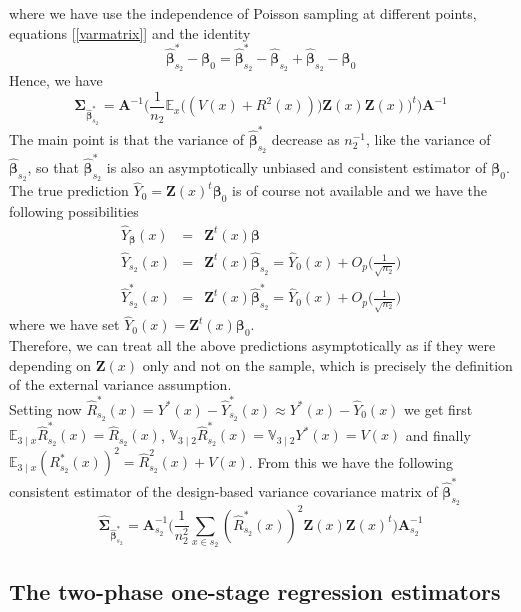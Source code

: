 \documentclass[a4paper,12pt,leqno, titlepage]{article}
\newcommand{\EX}{\mathbb{E}}
\newcommand{\VAR}{\mathbb{V}}
\begin{document}
where we have use the independence of Poisson sampling at different points, equations [\ref{varmatrix}] and the identity
$$\hat{\pmb{\beta}}^*_{s_2}-\pmb{\beta}_0=\hat{\pmb{\beta}}^*_{s_2}-\hat{\pmb{\beta}}_{s_2}
+\hat{\pmb{\beta}}_{s_2}- \pmb{\beta}_0$$
Hence, we have
\begin{equation}\label{twostagedbcovmatrix}
\pmb{\Sigma}_{\hat{\pmb{\beta}}^*_{s_2}}=
\pmb{A}^{-1}\Big(\frac{1}{n_2}\EX_x\big((V(x)+R^2(x))\big)\pmb{Z}(x)\pmb{Z}(x)\big)^t\Big)\pmb{A}^{-1}
\end{equation}
The main point is that the variance of $\hat{\pmb{\beta}}^*_{s_2}$ decrease as $n_2^{-1}$, like the variance of $\hat{\pmb{\beta}}_{s_2}$, so that $\hat{\pmb{\beta}}^*_{s_2}$  is also an asymptotically unbiased and consistent estimator of $\pmb{\beta}_0$. The true prediction $\hat{Y}_0=\pmb{Z}(x)^t\pmb{\beta}_0$ is of course not available and we have the following possibilities
\begin{eqnarray}\label{predictions}
\hat{Y}_{\pmb{\beta}}(x)&=&\pmb{Z}^t(x)\pmb{\beta} \\ \nonumber
\hat{Y}_{s_2}(x)&=&\pmb{Z}^t(x)\hat{\pmb{\beta}}_{s_2}=\hat{Y}_0(x) +
O_p\big(\frac{1}{\sqrt{n_2}}\big) \\ \nonumber
\hat{Y}_{s_2}^*(x)&=&\pmb{Z}^t(x)\hat{\pmb{\beta}}^*_{s_2}=\hat{Y}_0(x) +
O_p\big(\frac{1}{\sqrt{n_2}}\big)
\end{eqnarray}
\noindent
where we have set $\hat{Y}_0(x)=\pmb{Z}^t(x)\pmb{\beta}_0$.\\
Therefore, we can treat all the above predictions asymptotically as if they were depending on $\pmb{Z}(x)$ only and not on the sample, which is precisely the definition of the external variance assumption.\\
Setting now $\hat{R}_{s_2}^*(x)=Y^*(x)-\hat{Y}_{s_2}^*(x)\approx Y^*(x)-\hat{Y}_0(x)$ we get first $\EX_{3 \mid x}\hat{R}_{s_2}^*(x)=\hat{R}_{s_2}(x)$, $\VAR_{3 \mid 2}\hat{R}_{s_2}^*(x)=\VAR_{3 \mid 2}Y^*(x)=V(x)$ and finally $\EX_{3 \mid x}(R_{s_2}^*(x))^2=\hat{R}_{s_2}^2(x)+V(x)$. From this we have the following consistent estimator of the design-based variance covariance matrix of $\hat{\pmb{\beta}}^*_{s_2}$
\begin{equation}\label{dbvariancetwostage}
\hat{\pmb{\Sigma}}_{\hat{\pmb{\beta}}^*_{s_2}} =\pmb{A}_{s_2}^{-1}
\Big(\frac{1}{n_2^2}\sum_{x\in{s_2}}(\hat{R}_{s_2}^*(x))^2\pmb{Z}(x)\pmb{Z}(x)^t\Big)\pmb{A}_{s_2}^{-1}
\end{equation}


\subsection{The two-phase one-stage regression estimators}\label{twophaseonestagereg}
\end{document}

